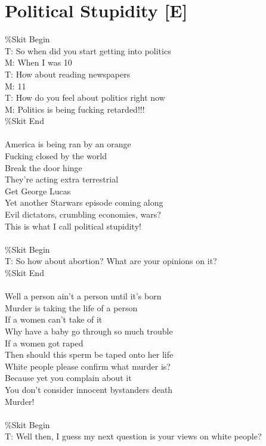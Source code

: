 \documentclass[12pt, b5paper, oneside]{book}
\begin{document}
\section{Political Stupidity [E]}
\%Skit Begin
\\T: So when did you start getting into politics
\\M: When I was 10
\\T: How about reading newspapers
\\M: 11
\\T: How do you feel about politics right now
\\M: Politics is being fucking retarded!!!
\\\%Skit End
%
\\\\America is being ran by an orange
\\Fucking closed by the world
\\Break the door hinge
\\They're acting extra terrestrial
\\Get George Lucas
\\Yet another Starwars episode coming along
\\Evil dictators, crumbling economies, wars?
\\This is what I call political stupidity!
%
\\\\\%Skit Begin
\\T: So how about abortion? What are your opinions on it?
\\\%Skit End
%
\\\\Well a person ain't a person until it's born
\\Murder is taking the life of a person
\\If a women can't take of it
\\Why have a baby go through so much trouble
\\If a women got raped
\\Then should this sperm be taped onto her life
\\White people please confirm what murder is?
\\Because yet you complain about it
\\You don't consider innocent bystanders death
\\Murder!
%
\\\\\%Skit Begin
\\T: Well then, I guess my next question is your views on white people?
\end{document}

